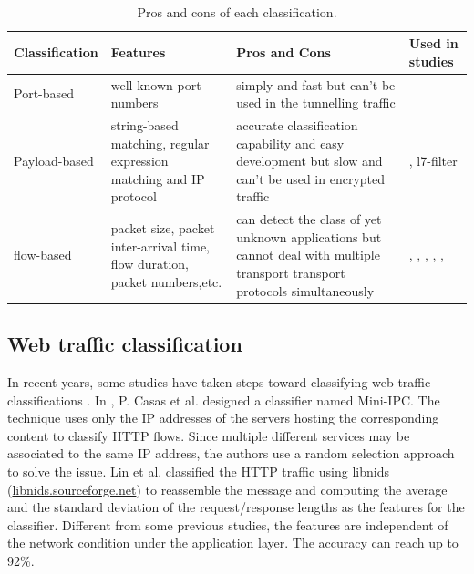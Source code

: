 \documentclass[preprint,12pt]{elsarticle}
\begin{document}
\
\begin{table}[H]
\centering
\caption{Pros and cons of each classification.}
\begin{tabular}{|l|p{3.5cm}|p{3.5cm}|p{3.5cm}|}
\hline Classification & Features & Pros and Cons & Used in studies \\
\hline
\hline Port-based & well-known port numbers & simply and fast but can't be used in the tunnelling traffic & \cite{TTC}\\
\hline Payload-based &  string-based matching, regular expression matching and IP protocol & accurate classification capability and easy development but slow and can't be used in encrypted traffic & \cite{nDPI} , {l7-filter} \\
\hline flow-based & packet size, packet inter-arrival time, flow duration, packet numbers,etc. & can detect the class of yet unknown applications but cannot deal with multiple transport transport protocols simultaneously & \cite{EAI06}, \cite{ATC13}, \cite{AIS14}, \cite{CMF04}, \cite{COC12}, \cite{FPN13, RTC10, AIS14, ASA09, FTC09} \\
\hline 
\end{tabular}
\label{table:pros-cons}
\end{table}


\subsection{Web traffic classification}
\label{sec:web}

In recent years, some studies have taken steps toward classifying web traffic classifications \cite{TFT14, OTP11, DHC11, MAM13}. In \cite{MAM13}, P. Casas et al. designed a classifier named Mini-IPC. The technique uses only the IP addresses of the servers hosting the corresponding content to classify HTTP flows. Since multiple different services may be associated to the same IP address, the authors use a random selection approach to solve the issue. Lin et al. classified the HTTP traffic using libnids (\url{libnids.sourceforge.net}) to reassemble the message and computing the average and the standard deviation of the request/response lengths as the features for the classifier. Different from some previous studies, the features are independent of the network condition under the application layer. The accuracy can reach up to 92\%.



\end{document}
